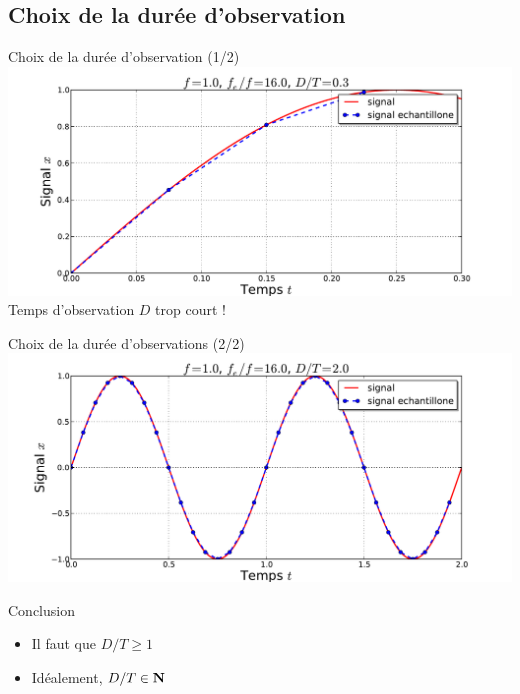 \documentclass[8pt,a4paper]{beamer}
\begin{document}
  \subsection{Choix de la durée d'observation}
  \begin{frame}{Choix de la durée d'observation (1/2)}
  \includegraphics[width=1.\textwidth]{figures/echant_sin_3.pdf}\\
  \alert{Temps d'observation $D$ trop court !}
  \end{frame}
  \begin{frame}{Choix de la durée d'observations (2/2)}
  \includegraphics[width=1.\textwidth]{figures/echant_sin_0.pdf}\\
  \begin{alertblock}{Conclusion}
  \begin{itemize}
  \item Il faut que $D/T \geq 1$ 
  \item Idéalement, $D/T \in \bf N$
  \end{itemize}
  \end{alertblock}
  \end{frame}
\end{document}
